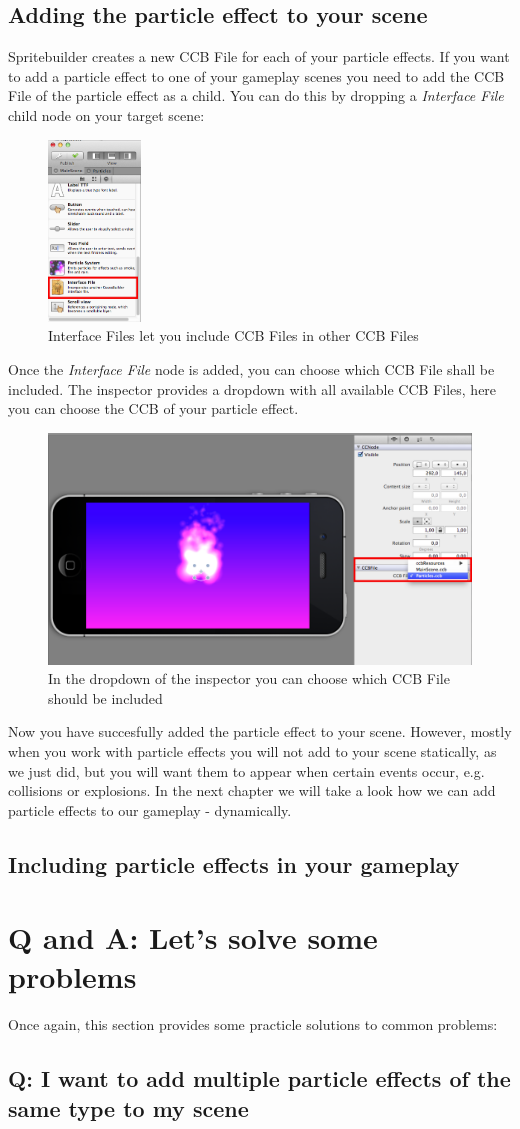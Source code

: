 \subsection{Adding the particle effect to your scene}
Spritebuilder creates a new CCB File for each of your particle effects. If you
want to add a particle effect to one of your gameplay scenes you need to add the
CCB File of the particle effect as a child. 
You can do this by dropping a \textit{Interface File} child node on your target
scene:
\begin{figure}[H]
		\centering
		\includegraphics[width=70pt]{images/particles/Spritebuilder_ParticleEffect_AddInterfaceFile.png}   
		\caption{Interface Files let you include CCB Files in other CCB Files}
\end{figure}
Once the \textit{Interface File} node is added, you can choose which CCB File
shall be included. The inspector provides a dropdown with all available CCB
Files, here you can choose the CCB of your particle effect.
 \begin{figure}[H]
		\centering
		\includegraphics[width=375pt]{images/particles/Spritebuilder_ParticleEffect_InterfaceFile.png}
		\caption{In the dropdown of the inspector you can choose which CCB File
		should be included}
\end{figure}
Now you have succesfully added the particle effect to your scene. However,
mostly when you work with particle effects you will not add to your scene
statically, as we just did, but you will want them to appear when certain events
occur, e.g. collisions or explosions. In the next chapter we will take a look
how we can add particle effects to our gameplay - dynamically. 
\subsection{Including particle effects in your gameplay}
 
\section{Q and A: Let's solve some problems}
Once again, this section provides some practicle solutions to common problems:
\subsection{Q: I want to add multiple particle effects of the same type to my
scene} 